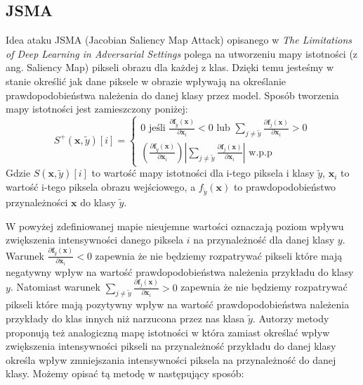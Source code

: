 \documentclass[
    left=2.5cm,         %
    right=2.5cm,        %
    top=2.5cm,          %
    bottom=3cm,         %
    bindingoffset=6mm,  %
    nohyphenation=false %
]{eiti/eiti-thesis}
\renewcommand{\vec}[1]{\mathbf{#1}}
\begin{document}
\subsection{JSMA}
Idea ataku JSMA (Jacobian Saliency Map Attack) opisanego w
\textit{The Limitations of Deep Learning in Adversarial Settings}\cite{DBLP:journals/corr/PapernotMJFCS15}
polega na utworzeniu mapy istotności (z ang. Saliency Map) pikseli obrazu dla każdej z klas.
Dzięki temu jesteśmy w stanie określić jak dane piksele w obrazie wpływają na określanie prawdopodobieństwa należenia
do danej klasy przez model. Sposób tworzenia mapy istotności jest zamieszczony poniżej:
\begin{equation}\label{jsma+}
S^{+} ( \vec{ x }, \widetilde{y} ) [ i ] = \left\{
\begin{array}
{ c } { 0 \text { jeśli } \frac { \partial \mathbf {f} _ { \widetilde{y} } ( \mathbf {x} ) } { \partial \mathbf {x} _ { i } } < 0 \text { lub } \sum _ { j \neq \widetilde{y} } \frac { \partial \mathbf {f} _ { j } ( \mathbf {x} ) } { \partial \mathbf {x} _ { i } } > 0 } \\
{ \left( \frac { \partial \mathbf {f} _ { \widetilde{y} } ( \mathbf {x} ) } { \partial \mathbf {x} _ { i } } \right) \left| \sum _ { j \neq \widetilde{y} } \frac { \partial \mathbf {f} _ { j } ( \mathbf {x} ) } { \partial \mathbf {x} _ { i } } \right| \text { w.p.p } } \end{array} \right.
\end{equation}
Gdzie \( S(\vec{x}, \widetilde{y})[i] \) to wartość mapy istotności dla i-tego piksela i klasy $\widetilde{y}$,
$\vec{x}_i$ to wartość i-tego piksela obrazu wejściowego, a
$f_{\widetilde{y}}(\vec{x})$ to prawdopodobieństwo przynależności $\vec{x}$ do klasy $\widetilde{y}$.

W powyżej zdefiniowanej mapie nieujemne wartości oznaczają poziom wpływu zwiększenia intensywności danego piksela $i$
na przynależność dla danej klasy $y$.
Warunek $\frac { \partial \mathbf {f} _ { \widetilde{y} } ( \mathbf {x} ) } { \partial \mathbf {x} _ { i } } < 0$
zapewnia że nie będziemy rozpatrywać pikseli które mają negatywny wpływ na wartość prawdopodobieństwa należenia przykładu
do klasy $y$.
Natomiast warunek $\sum _ { j \neq \widetilde{y} } \frac { \partial \mathbf {f} _ { j } ( \mathbf {x} ) } { \partial \mathbf {x} _ { i } } > 0 $
zapewnia że nie będziemy rozpatrywać pikseli które mają pozytywny wpływ na wartość prawdopodobieństwa należenia przykłady do klas
innych niż narzucona przez nas klasa $\widetilde{y}$. Autorzy metody proponują też analogiczną mapę istotności w która
zamiast określać wpływ zwiększenia intensywności pikseli na przynależność przykładu do danej klasy określa wpływ zmniejszania
intensywności piksela na przynależność do danej klasy. Możemy opisać tą metodę w następujący sposób:
\end{document}
